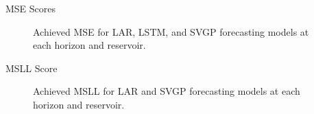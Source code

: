 \begin{frame}{MSE Scores}
	\begin{figure}[htbp]
		\setlength{} 
		\setlength{}
		\hspace{-1.5em}
		\hspace{-1.5em}
		\caption{Achieved MSE for LAR, LSTM, and SVGP forecasting models at each horizon and reservoir.}
		\label{fig:mse_scores} 
	\end{figure}
\end{frame}

\begin{frame}{MSLL Score}
	\begin{figure}[htbp]
		\setlength{} 
		\setlength{}
		\hspace{-1.5em}
		\caption{{Achieved MSLL} %
			for LAR and SVGP forecasting models at each horizon and reservoir.}
		\label{fig:msll_scores} 
	\end{figure}
\end{frame}


